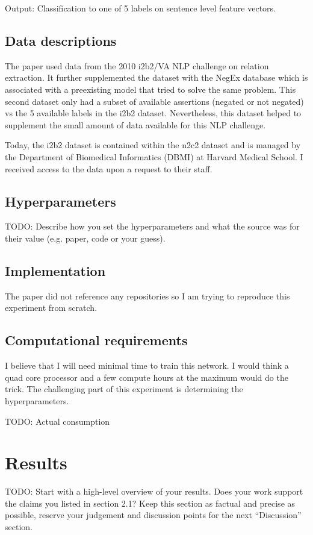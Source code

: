 \documentclass[11pt,a4paper]{article}
\begin{document}
Output: Classification to one of 5 labels on sentence level feature vectors.

\subsection{Data descriptions}
The paper used data from the 2010 i2b2/VA NLP challenge on relation extraction. It further supplemented the dataset with the NegEx database which is associated with a preexisting model that tried to solve the same problem. This second dataset only had a subset of available assertions (negated or not negated) vs the 5 available labels in the i2b2 dataset. Nevertheless, this dataset helped to supplement the small amount of data available for this NLP challenge.

Today, the i2b2 dataset is contained within the n2c2 dataset and is managed by the Department of Biomedical Informatics (DBMI) at Harvard Medical School. I received access to the data upon a request to their staff.

\subsection{Hyperparameters}
TODO: 
Describe how you set the hyperparameters and what the source was for their value (e.g. paper, code or your guess). 

\subsection{Implementation}
The paper did not reference any repositories so I am trying to reproduce this experiment from scratch.

\subsection{Computational requirements}

I believe that I will need minimal time to train this network. I would think a quad core processor and a few compute hours at the maximum would do the trick. The challenging part of this experiment is determining the hyperparameters.

TODO: Actual consumption

\section{Results}
TODO: 
Start with a high-level overview of your results. Does your work support the claims you listed in section 2.1? Keep this section as factual and precise as possible, reserve your judgement and discussion points for the next ``Discussion'' section. 
\end{document}
